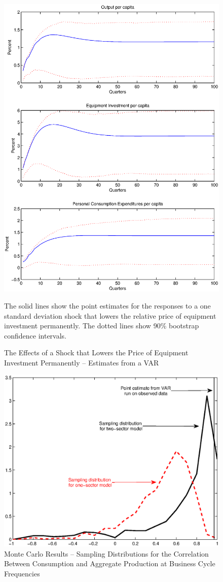 \documentclass[12pt,fleqn]{article}
\renewcommand{\baselinestretch}{1.5}
\begin{document}
\begin{figure}[tbp] \caption{The Effects of a Shock that Lowers the Price of Equipment
Investment Permanently --  Estimates from a VAR} \center
\label{figure_datavar}
\includegraphics[scale=0.8]{figure_datavar.ps}

\renewcommand{\baselinestretch}{1}
 \footnotesize \flushleft The solid lines show the point estimates for the
responses to a one standard deviation shock that lowers the relative
price of equipment investment permanently. The dotted lines show
90\% bootstrap confidence intervals.
\end{figure}


\begin{figure}[tbp] \center
\caption{Monte Carlo Results -- Sampling Distributions for the
Correlation Between Consumption and Aggregate Production at Business
Cycle Frequencies}  \label{figure_samplingdistribution}
\includegraphics[scale=0.9]{figure_samplingdistribution.ps}
\end{figure}
\end{document}
